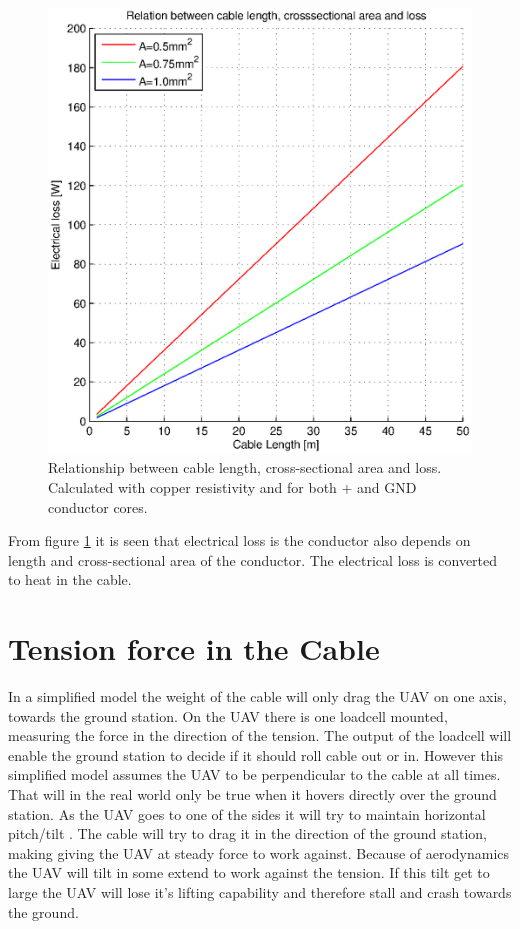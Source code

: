 \begin{figure}[H]
\centering
\includegraphics[scale=0.6]{graphics/matlab/cable_relation_lenght_loss_crosssection.eps}
\caption[Relationship between cable length, cross-sectional area and loss.]{Relationship between cable length, cross-sectional area and loss. Calculated with copper resistivity and for both + and GND conductor cores.}
\label{fig:relationship_loss_length}
\end{figure}

\noindent
From figure \ref{fig:relationship_loss_length} it is seen that electrical loss is the conductor also depends on length and cross-sectional area of the conductor. The electrical loss is converted to heat in the cable.


\section{Tension force in the Cable}
In a simplified model the weight of the cable will only drag the UAV on one axis, towards the ground station. On the UAV there is one loadcell mounted, measuring the force in the direction of the tension. The output of the loadcell will enable the ground station to decide if it should roll cable out or in. However this simplified model assumes the UAV to be perpendicular to the cable at all times. 
That will in the real world only be true when it hovers directly over the ground station. As the UAV goes to one of the sides it will try to maintain horizontal pitch/tilt . The cable will try to drag it in the direction of the ground station, making giving the UAV at steady force to work against. Because of aerodynamics the UAV will tilt in some extend to work against the tension. If this tilt get to large the UAV will lose it's lifting capability and therefore stall and crash towards the ground.   

